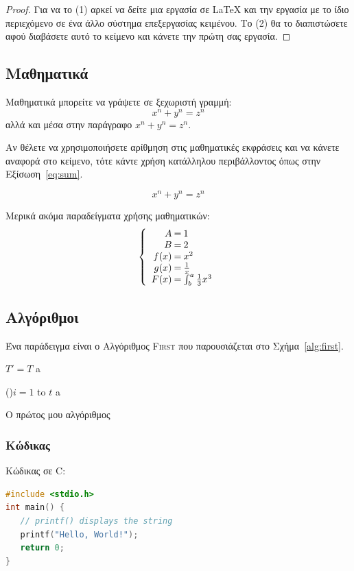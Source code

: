 \documentclass[a4paper,11pt]{article}
\begin{document}
\begin{proof}
Για να το (1) αρκεί να δείτε μια εργασία σε {\LaTeX} και την εργασία με το ίδιο περιεχόμενο σε ένα άλλο σύστημα επεξεργασίας κειμένου.  Το (2) θα το διαπιστώσετε αφού διαβάσετε αυτό το κείμενο και κάνετε την πρώτη σας εργασία. 
\end{proof}

%
%
\subsection{Μαθηματικά}\label{sec:math}
Μαθηματικά μπορείτε να γράψετε σε ξεχωριστή γραμμή:
\[ x^n + y^n = z^n \]
αλλά και μέσα στην παράγραφο $x^n + y^n = z^n$.

Αν θέλετε να χρησιμοποιήσετε αρίθμηση στις μαθηματικές εκφράσεις και να κάνετε αναφορά στο κείμενο, τότε κάντε χρήση κατάλληλου περιβάλλοντος όπως στην Εξίσωση~\ref{eq:sum}.

\begin{equation}
x^n + y^n = z^n
\label{eq:sum}    
\end{equation}

Μερικά ακόμα παραδείγματα χρήσης μαθηματικών:
\[\left\{
\begin{array}{r@{\:=\:}ll}
A & 1\\
B & 2\\
  f(x) & x^2\\
  g(x) & \frac{1}{x}\\
  F(x) & \int^a_b \frac{1}{3}x^3
\end{array}
\right.
\]

%
%
\subsection{Αλγόριθμοι} \label{sec:alg}
Ένα παράδειγμα είναι ο Αλγόριθμος \textsc{First} που παρουσιάζεται στο Σχήμα~\ref{alg:first}.

 \begin{algorithm}[t]
 \scriptsize
 \BlankLine

 $T' =T$ 
  {
 a
 }

 \For(){$i=1$ to $t$}{ \label{alg:tCM:for}%
 a
 }
\caption{Ο πρώτος μου αλγόριθμος}
\label{alg:first}
 \end{algorithm}

%
\subsubsection{Κώδικας}\label{sec:code}
Κώδικας σε C:
\begin{lstlisting}[language=C]
#include <stdio.h>
int main() {
   // printf() displays the string
   printf("Hello, World!");
   return 0;
}
\end{lstlisting}
\end{document}
